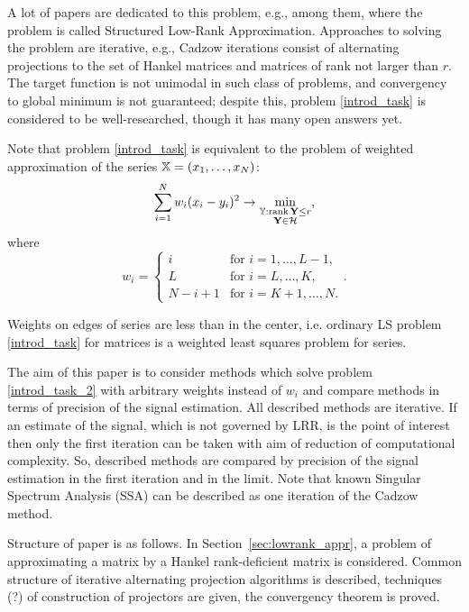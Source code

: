 \documentclass[12pt,a4paper,fleqn,leqno]{article}
\def\rank{\mathop{\mathrm{rank}}}
\begin{document}
A lot of papers are dedicated to this problem, e.g., \cite{Cadzow1988, Markovsky2011, Usevich.Markovsky2014, Gillard.Zhigljavsky2013} among them, where the problem is called Structured Low-Rank Approximation. Approaches to solving the problem are iterative, e.g., Cadzow iterations \cite{Cadzow1988} consist of alternating projections to the set of Hankel matrices and matrices of rank not larger than $r$. The target function is not unimodal in such class of problems, and convergency to global minimum is not guaranteed; despite this, problem \eqref{introd_task} is considered to be well-researched, though it has many open answers yet.

Note that problem \eqref{introd_task} is equivalent to the problem of weighted approximation of the series $\mathbb{X} = (x_1, \ldots, x_N)$:
\begin{equation}\label{introd_task_2}
\sum_{i = 1}^N w_i(x_i - y_i)^2 \to \min_{\substack{\tsY: \rank \bfY \le r \\ \bfY \in \calH}},
\end{equation}
where
\begin{equation}
\label{eq:w}
w_i = \begin{cases}
i & \text{for $i = 1, \ldots, L-1,$}\\
L & \text{for $i = L, \ldots, K,$}\\
N - i + 1 & \text{for $i = K + 1, \ldots, N.$}
\end{cases}.
\end{equation}

Weights on edges of series are less than in the center, i.e. ordinary LS problem \eqref{introd_task} for matrices is a weighted least squares problem for series.

The aim of this paper is to consider methods which solve problem \eqref{introd_task_2} with arbitrary weights instead of $w_i$ and compare methods in terms of precision of the signal estimation. All described methods are iterative. If an estimate of the signal, which is not governed by LRR, is the point of interest then only the first iteration can be taken with aim of reduction of computational complexity. So, described methods are compared by precision of the signal estimation in the first iteration and in the limit. Note that known Singular Spectrum Analysis (SSA) \cite{Broomhead.King1986, Vautard.etal1992, Elsner.Tsonis1996, Golyandina.etal2001, Ghil.etal2002, Golyandina.Zhigljavsky2012} can be
described as one iteration of the Cadzow method.

Structure of paper is as follows.  In Section~\ref{sec:lowrank_appr}, a problem of approximating a matrix by a Hankel rank-deficient matrix is considered. Common structure of iterative alternating projection algorithms is described, techniques (?) of construction of projectors are given, the convergency theorem is proved.
\end{document}
